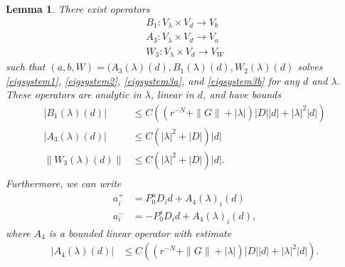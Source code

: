 \documentclass[12pt]{elsarticle}
\newtheorem{lemma}{Lemma}
\begin{document}
\begin{lemma}\label{eiginv3}
There exist operators 
\begin{align*}
B_1 : V_\lambda \times V_d \rightarrow V_b \\
A_3 : V_\lambda \times V_d \rightarrow V_a \\
W_3 : V_\lambda \times V_d \rightarrow V_W
\end{align*}
such that $(a, b, W) = (A_3(\lambda)(d), B_1(\lambda)(d), W_2(\lambda)(d)$ solves \cref{eigsystem1}, \cref{eigsystem2}, \cref{eigsystem3a}, and \cref{eigsystem3b} for any $d$ and $\lambda$. These operators are analytic in $\lambda$, linear in $d$, and have bounds 
\begin{align}
|B_1(\lambda)(d)| &\leq C \left( (r^{-N} + \|G\| + |\lambda|)|D| |d| + |\lambda|^2 |d| \right) \label{B1bound} \\
|A_3(\lambda)(d)| &\leq C \left(|\lambda|^2 + |D|\right)|d| \label{A3bound} \\
\|W_3(\lambda)(d)\| &\leq C \left(|\lambda|^2 + |D|\right)|d|. \label{W3bound} \\
\end{align}
Furthermore, we can write
\begin{align*}
a_i^+ &= P_0^u D_i d + A_4(\lambda)_i(d) \\
a_i^- &= -P_0^s D_i d + A_4(\lambda)_i(d),
\end{align*}
where $A_4$ is a bounded linear operator with estimate
\begin{align}\label{A4bound}
|A_4(\lambda)(d)| &\leq 
C\left( (r^{-N} + \|G\| + |\lambda|)|D||d| + |\lambda|^2 |d|  \right).
\end{align}


\end{lemma}
\end{document}

